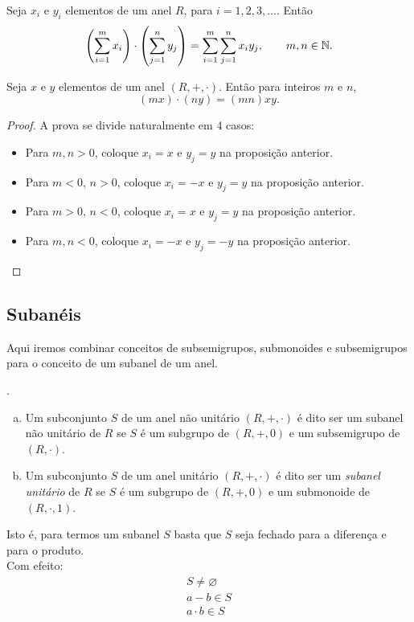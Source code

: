       \begin{stat}
         Seja $x_{i}$ e $y_{i}$ elementos de um anel $R$, para $i=1,2,3, ...$. Então $$\left(\sum^{m}_{i=1}x_{i}\right) \cdot \left(\sum^{n}_{j=1}y_{j}\right) = \sum^{m}_{i=1}\sum^{n}_{j=1}x_{i}y_{j},\quad \quad m,n \in \mathbb{N}.$$
      \end{stat}
      \begin{corollary}
         Seja $x$ e $y$ elementos de um anel $(R,+,\cdot)$. Então para inteiros $m$ e $n$, $$(mx) \cdot (ny) = (mn)xy.$$
         \begin{proof}
            A prova se divide naturalmente em 4 casos:
            \begin{itemize}
               \item Para $m,n > 0$, coloque $x_{i} = x$ e $y_{j} = y$ na proposição anterior.
               \item Para $m < 0$, $n > 0$, coloque $x_{i} = -x$ e $y_{j} = y$ na proposição anterior.
               \item Para $m > 0$, $n < 0$, coloque $x_{i} = x$ e $y_{j} = y$ na proposição anterior.
               \item Para $m,n < 0$, coloque $x_{i} = -x$ e $y_{j} = -y$ na proposição anterior.
            \end{itemize}
         \end{proof}
      \end{corollary}

   \subsection{Subanéis}
      Aqui iremos combinar conceitos de subsemigrupos, submonoides e subsemigrupos para o conceito de um subanel de um anel.
      \begin{definition}.
         \begin{enumerate}[(a)]
            \item Um subconjunto $S$ de um anel não unitário $(R, +, \cdot)$ é dito ser um subanel não unitário de $R$ se $S$ é um subgrupo de $(R,+,0)$ e um subsemigrupo de $(R,\cdot)$.
            \item Um subconjunto $S$ de um anel unitário $(R, +, \cdot)$ é dito ser um \emph{subanel unitário} de $R$ se $S$ é um subgrupo de $(R,+,0)$ e um submonoide de $(R,\cdot , 1)$.
         \end{enumerate}
      \end{definition}
      Isto é, para termos um subanel $S$ basta que $S$ seja fechado para a diferença e para o produto.\\
      Com efeito:
      \begin{align*}
         S \neq \varnothing\\
         a-b \in S\\
         a\cdot b \in S
      \end{align*}

